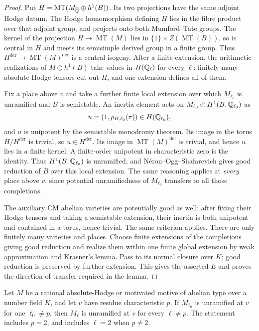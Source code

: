 \begin{proof}
Put $H=\operatorname{MT}(M_{\overline{\mathbb Q}}\oplus h^1(B))$.
Its two projections have the same adjoint Hodge datum.  The Hodge
homomorphism defining $H$ lies in the fibre product over that adjoint group,
and projects onto both Mumford--Tate groups.  The kernel of the projection
$H\to\operatorname{MT}(M)$ lies in $\{1\}\times Z(\operatorname{MT}(B))$,
so is central in $H$ and meets its semisimple derived group in a finite
group.  Thus $H^{\mathrm{der}}\to\operatorname{MT}(M)^{\mathrm{der}}$ is a
central isogeny.  After a finite extension, the arithmetic realizations of
$M\oplus h^1(B)$ take values in $H(\mathbb Q_\ell)$ for every $\ell$: finitely many
absolute Hodge tensors cut out $H$, and one extension defines all of them.

Fix a place above $v$ and take a further finite local extension over which
$M_{\ell_0}$ is unramified and $B$ is semistable.  An inertia element acts on
$M_{\ell_0}\oplus H^1(B,\mathbb Q_{\ell_0})$ as
\[
 u=(1,\rho_{B,\ell_0}(\tau))\in H(\mathbb Q_{\ell_0}),
\]
and $u$ is unipotent by the semistable monodromy theorem.  Its image in the
torus $H/H^{\mathrm{der}}$ is trivial, so $u\in H^{\mathrm{der}}$.
Its image in $\operatorname{MT}(M)^{\mathrm{der}}$ is trivial, and hence
$u$ lies in a finite kernel.  A finite-order unipotent in characteristic
zero is the identity.  Thus $H^1(B,\mathbb Q_{\ell_0})$ is unramified, and
N\'eron--Ogg--Shafarevich gives good reduction of $B$ over this local
extension.  The same reasoning applies at \emph{every} place above $v$,
since potential unramifiedness of $M_{\ell_0}$ transfers to all those
completions.

The auxiliary CM abelian varieties are potentially good as well: after
fixing their Hodge tensors and taking a semistable extension, their inertia
is both unipotent and contained in a torus, hence trivial.  The same
criterion applies.  There are only finitely many varieties and places.
Choose finite extensions of the completions giving good reduction and
realize them within one finite global extension by weak approximation and
Krasner's lemma.  Pass to its normal closure over $K$; good reduction is
preserved by further extension.  This gives the asserted $E$ and proves
the direction of transfer required in the lemma.
\end{proof}

\begin{theorem}
\label{c:ell-independence-abelian}
Let $M$ be a rational absolute-Hodge or motivated motive of abelian type
over a number field $K$, and let $v$ have residue characteristic $p$.
If $M_{\ell_0}$ is unramified at $v$ for one $\ell_0\ne p$, then
$M_\ell$ is unramified at $v$ for every $\ell\ne p$.
The statement includes $p=2$, and includes $\ell=2$ when $p\ne2$.
\end{theorem}

